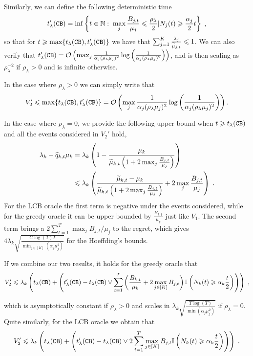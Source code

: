 Similarly, we can define the following deterministic time
\[t_\lambda'(\texttt{CB})= \inf\left\{t \in \mathbb{N}: \; \max_j \frac{B_{j,t}}{\mu_j}\leqslant \frac{\rho_\lambda}{2} | N_j(t)\geqslant \frac{\alpha_j}{2}t \right\}\;,\] so that for $t\geqslant \max\{t_\lambda(\texttt{CB}), t_\lambda'(\texttt{CB})\}$ we have that $\sum_{j=1}^K \frac{\lambda_j}{\widetilde{\mu}_{j, t}} \leqslant 1$. We can also verify that $t_\lambda'(\texttt{CB})=\mathcal{O}\left(\max_j\frac{1}{\alpha_j(\rho_\lambda \mu_j)^2}\log\left(\frac{1}{\alpha_j(\rho_\lambda \mu_j)^2}\right)\right)$, and is then scaling as $\rho_\lambda^{-2}$ if $\rho_\lambda>0$ and is infinite otherwise.

In the case where $\rho_\lambda>0$ we can simply write that \[V_2' \leqslant \max\{t_\lambda(\texttt{CB}), t_\lambda'(\texttt{CB})\}= \mathcal{O}\left(\max_j\frac{1}{\alpha_j(\rho_\lambda\mu_j)^2}\log\left(\frac{1}{\alpha_j(\rho_\lambda\mu_j)^2}\right)\right).\]

In the case where $\rho_\lambda=0$, we provide the following upper bound when $t \geqslant t_\lambda(\texttt{CB})$ and all the events considered in $V_2'$ hold, 
\begin{align*}
\lambda_k - \widehat{q}_{k,t} \mu_k & = \lambda_k \left(1- \frac{\mu_k}{\widetilde{\mu}_{k, t}\left(1+2\max_j \frac{B_{j,t}}{\mu_j}\right)}\right) \\ 
& \leqslant \lambda_k \left(\frac{\widetilde{\mu}_{k,t}- \mu_k}{\widetilde{\mu}_{k, t}\left(1+2\max_j \frac{B_{j,t}}{\mu_j}\right)} +2\max_j \frac{B_{j,t}}{\mu_j} \right) \;.
\end{align*} 
For the LCB oracle the first term is negative under the events considered, while for the greedy oracle it can be upper bounded by $\frac{B_{k,t}}{\mu_k}$ just like $V_1$. The second term brings a $2\sum_{t=1}^T \max_j B_{j,t}/\mu_j$ to the regret, which gives $4\lambda_k\sqrt{\frac{C\log(T)T}{\min_{j \in [K]} (\alpha_j\mu_j^2)}}$ for the Hoeffding's bounds.

If we combine our two results, it holds for the greedy oracle that
\[ V_2' \leqslant \lambda_k\left(t_\lambda(\texttt{CB}) + \left(t_\lambda'(\texttt{CB})-t_\lambda(\texttt{CB}) \vee  \sum_{t=1}^T \left(\frac{B_{k,t}}{\mu_k}+2\max_{j\in[K]}B_{j,t}\right)\mathbb{I}\left(N_k(t)\geqslant \alpha_k\frac{t}{2}\right) \right)\right) \;,   \]

which is asymptotically constant if $\rho_\lambda>0$ and scales in $\lambda_k \sqrt{\frac{T\log(T)}{\min (\alpha_j \mu_j^2 )}}$ if $\rho_\lambda=0$. Quite similarly, for the LCB oracle we obtain that
\[ V_2' \leqslant \lambda_k\left(t_\lambda(\texttt{CB}) + \left(t_\lambda'(\texttt{CB})-t_\lambda(\texttt{CB}) \vee 2\sum_{t=1}^T \max_{j\in[K]}B_{j,t}\mathbb{I}\left(N_k(t)\geqslant \alpha_k\frac{t}{2}\right) \right)\right)  \;.   \]

